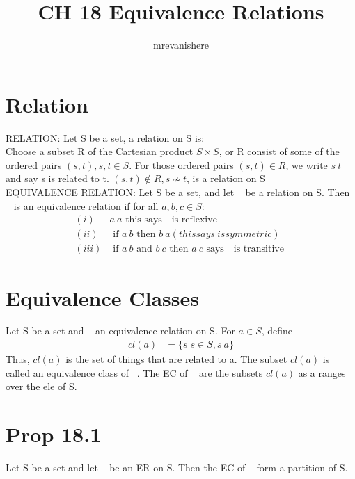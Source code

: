 \documentclass[12pt]{article}
\begin{document}
\title{CH 18 Equivalence Relations}
\author{mrevanishere}
\maketitle

\section{Relation}
	RELATION: Let S be a set, a relation on S is: \\
	Choose a subset R of the Cartesian product $ S \times S $, or
	R consist of some of the ordered pairs $ (s, t), s, t \in S $. For those
	ordered pairs $ (s, t) \in R $, we write $ s ~ t $ and say
	s is related to t. $ (s, t ) \not\in R, s \nsim t $, is a relation on S \\
	EQUIVALENCE RELATION: Let S be a set, and let ~ be a relation on S. Then
	~ is an equivalence relation if for all $ a, b, c \in S $:
	\begin{align*}
		(i)& a ~ a \text{ this says ~ is reflexive } \\
		(ii)& \text{ if } a ~ b \text{ then } b ~ a ( this says ~ is symmetric )\\
		(iii)& \text{ if } a ~ b \text{ and } b ~ c \text{ then } a~c \text{ says ~ is transitive }
	\end{align*}
\section{Equivalence Classes}
	Let S be a set and ~ an equivalence relation on S. For $ a \in S $, define
	\begin{align*}
		cl(a) &= \{ s|s \in S, s ~ a \}
	\end{align*}
	Thus, $ cl(a) $ is the set of things that are related to a. The subset
	$ cl(a) $ is called an equivalence class of ~. The EC of ~ are the subsets
	$ cl(a) $ as a ranges over the ele of S.
\section{Prop 18.1}
	Let S be a set and let ~ be an ER on S. Then the EC of ~ form a 
	partition of S.
\end{document}
